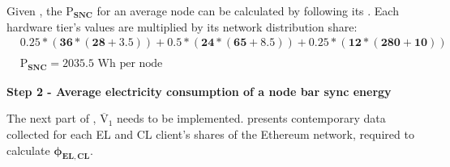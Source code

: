 Given , the $\boldsymbol{\mathrm{P}_{SNC}}$ for an average node can be calculated by following its . Each hardware tier's values are multiplied by its network distribution share: 
\begin{align}
    &\boldsymbol{0.25*(36*(28 + 3.5)) + 0.5*(24*(65+8.5)) + 0.25*(12*(280+10))} \nonumber\\ \nonumber \\
    &\boldsymbol{{\mathrm{P}_{SNC}} = 2035.5} \text{ Wh per node} \nonumber
\end{align}


\textbf{Step 2 - Average electricity consumption of a node bar sync energy}
\label{postSyncEnergyImplementation}

The next part of , $\boldsymbol{\mathrm{\overline{V}_{1}}}$ needs to be implemented.  presents contemporary data collected for each EL and CL client's shares of the Ethereum network, required to calculate $\boldsymbol{\phi_{EL,CL}}$.  

